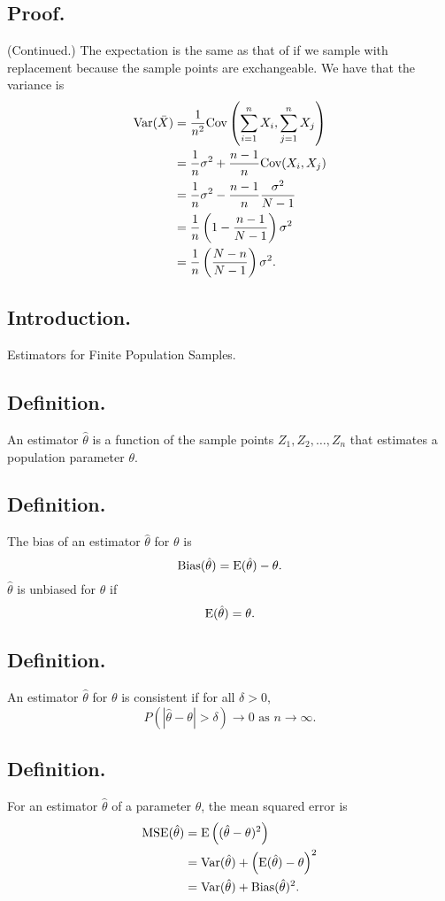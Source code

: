 \documentclass[titlepage]{article}
\begin{document}
\subsection{Proof.} (Continued.) The expectation is the same as that of if we sample with replacement because the sample points are exchangeable. We have that the variance is 
\begin{align*}
    \text{Var}(\bar{X}) &= \frac{1}{n^{2}}\text{Cov}\left(\sum_{i=1}^{n}X_{i}, \sum_{j=1}^{n}X_{j}\right) \\
                  &= \frac{1}{n}\sigma^{2} + \frac{n-1}{n}\text{Cov}(X_{i}, X_{j}) \\
                  &= \frac{1}{n}\sigma^{2} - \frac{n-1}{n}\frac{\sigma^{2}}{N-1} \\
                  &= \frac{1}{n}\left(1 - \frac{n-1}{N-1}\right)\sigma^{2} \\
                  &= \frac{1}{n}\left(\frac{N-n}{N-1}\right)\sigma^{2}.
\end{align*}

\newpage {}

\subsection{Introduction.} Estimators for Finite Population Samples.

\subsection{Definition.} An estimator $\hat{\theta}$ is a function of the sample points $Z_{1}, Z_{2}, \ldots, Z_{n}$ that estimates a population parameter $\theta$.

\subsection{Definition.} The bias of an estimator $\hat{\theta}$ for $\theta$ is 
$$\text{Bias}(\hat{\theta}) = \text{E}(\hat{\theta}) - \theta.$$
$\hat{\theta}$ is unbiased for $\theta$ if
$$\text{E}(\hat{\theta}) = \theta.$$

\subsection{Definition.} An estimator $\hat{\theta}$ for $\theta$ is consistent if for all $\delta > 0$, 
$$P(|\hat{\theta} - \theta| > \delta) \to 0 \text{ as } n \to \infty.$$

\subsection{Definition.} For an estimator $\hat{\theta}$ of a parameter $\theta$, the mean squared error is 
\begin{align*}
    \text{MSE}(\hat{\theta}) &= \text{E}\left((\hat{\theta} - \theta)^{2}\right) \\
                       &= \text{Var}(\hat{\theta}) + \left(\text{E}(\hat{\theta}) - \theta\right)^{2} \\
                       &= \text{Var}(\hat{\theta}) + \text{Bias}(\hat{\theta})^{2}.
\end{align*}
\end{document}
